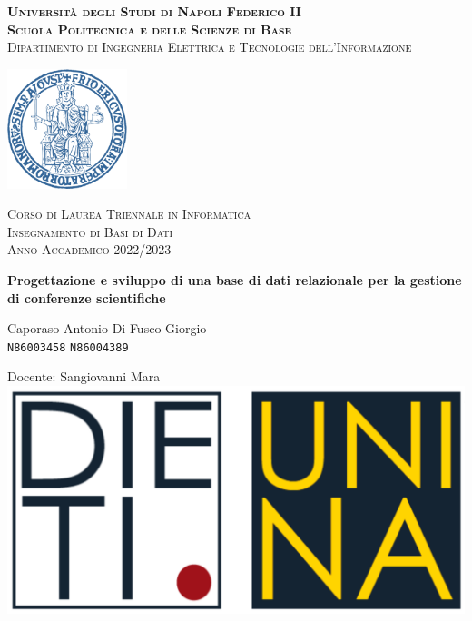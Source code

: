 \documentclass[a4paper, oneside, 10pt]{book}
\begin{document}
\begin{titlepage}
\begin{center}
\setlength{\parskip}{2ex}
{\LARGE\textsc{\textbf{Università degli Studi di Napoli Federico II}}}\\

{\Large\textsc{\textbf{Scuola Politecnica e delle Scienze di Base}}}\\{\large\textsc{Dipartimento di Ingegneria Elettrica e Tecnologie dell'Informazione}}\\
\vspace{1cm}

{\includegraphics[width=3.5cm]{Immagini/LogoUnina.png}}{}

\vspace{1cm}

{\large\textsc{Corso di Laurea Triennale in Informatica}}\\
{\large\textsc{Insegnamento di Basi di Dati}}\\
{\large\textsc{Anno Accademico 2022/2023}}\\
\vspace{4cm}

{\Huge{\textbf{Progettazione e sviluppo di una base di dati relazionale per la gestione di conferenze scientifiche}}}

\vspace{1cm}
\vfill

{\Large Caporaso Antonio} \qquad \Large{Di Fusco Giorgio}\\
\texttt{N86003458} \qquad \texttt{N86004389}\\

\vspace{1cm}

Docente: Sangiovanni Mara\\

\vspace{1cm}
\includegraphics[scale=0.6]{Immagini/logo_dieti.png}
\end{center}
\end{titlepage}
\end{document}
